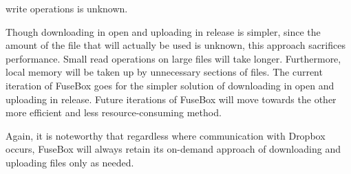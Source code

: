 \documentclass[11pt,twocolumn,letterpaper]{article}
\newcommand{\appname}{FuseBox }
\begin{document}
write operations is unknown. 
\par Though downloading in open and uploading
in release is simpler, since the amount of the file that will actually
be used is unknown, this approach sacrifices performance. Small read
operations on large files will take longer. Furthermore, local memory
will be taken up by unnecessary sections of files.  
The current iteration of
\appname goes for the simpler solution of downloading in open and
uploading in release. Future iterations of \appname will move towards
the other more efficient and less resource-consuming method.  
\par Again, it is noteworthy that regardless where communication with
Dropbox occurs, \appname will
always retain its on-demand approach of downloading and uploading
files only as needed. 
\end{document}
